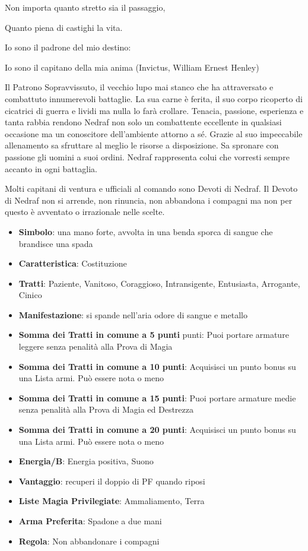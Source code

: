 \begin{multicols}{2}
\begin{changemargin}{0.3cm}{0.3cm}
\begin{enfasi}
{Non importa quanto stretto sia il passaggio,

Quanto piena di castighi la vita.

Io sono il padrone del mio destino:

Io sono il capitano della mia anima (Invictus, William Ernest Henley)
}\end{enfasi}\end{changemargin}\medskip

Il Patrono Sopravvissuto, il vecchio lupo mai stanco che ha attraversato e combattuto innumerevoli battaglie. La sua carne è ferita, il suo corpo ricoperto di cicatrici di guerra e lividi ma nulla lo farà crollare. Tenacia, passione, esperienza e tanta rabbia rendono Nedraf non solo un combattente eccellente in qualsiasi occasione ma un conoscitore dell'ambiente attorno a sé. Grazie al suo impeccabile allenamento sa sfruttare al meglio le risorse a disposizione. Sa spronare con passione gli uomini a suoi ordini.
Nedraf rappresenta colui che vorresti sempre accanto in ogni battaglia.

Molti capitani di ventura e ufficiali al comando sono Devoti di Nedraf. Il Devoto di Nedraf non si arrende, non rinuncia, non abbandona i compagni ma non per questo è avventato o irrazionale nelle scelte.

\begin{itemize}[leftmargin=*] \setlength{\itemsep}{0pt}
\item \textbf{Simbolo}: una mano forte, avvolta in una benda sporca di sangue che brandisce una spada
\item \textbf{Caratteristica}: Costituzione
\item \textbf{Tratti}: Paziente, Vanitoso, Coraggioso, Intransigente, Entusiasta, Arrogante, Cinico
\item \textbf{Manifestazione}: si spande nell'aria odore di sangue e metallo
\item \textbf{Somma dei Tratti in comune a 5 punti} punti: Puoi portare armature leggere senza penalità alla Prova di Magia
\item \textbf{Somma dei Tratti in comune a 10 punti}: Acquisisci un punto bonus su una Lista armi. Può essere nota o meno
\item \textbf{Somma dei Tratti in comune a 15 punti}: Puoi portare armature medie senza penalità alla Prova di Magia ed Destrezza
\item \textbf{Somma dei Tratti in comune a 20 punti}: Acquisisci un punto bonus su una Lista armi. Può essere nota o meno
\item \textbf{Energia/B}: Energia positiva, Suono
\item \textbf{Vantaggio}: recuperi il doppio di PF quando riposi
\item \textbf{Liste Magia Privilegiate}: Ammaliamento, Terra
\item \textbf{Arma Preferita}: Spadone a due mani
\item \textbf{Regola}: Non abbandonare i compagni
\end{itemize}


\end{multicols}
